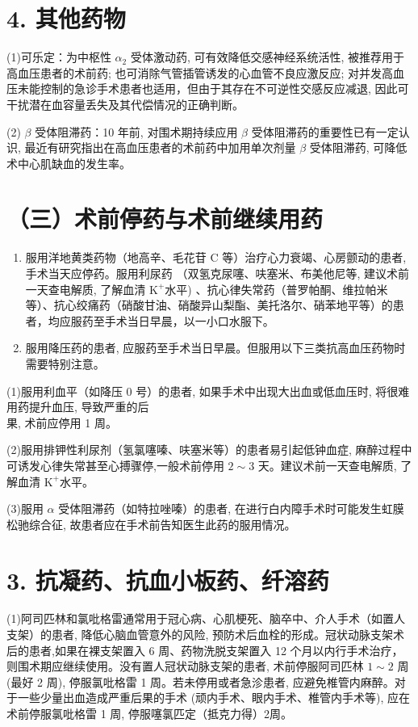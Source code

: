 \documentclass[10pt]{article}
\begin{document}
\section*{4. 其他药物}
(1)可乐定：为中枢性 $\alpha_{2}$ 受体激动药, 可有效降低交感神经系统活性, 被推荐用于高血压患者的术前药; 也可消除气管插管诱发的心血管不良应激反应; 对并发高血压未能控制的急诊手术患者也适用，但由于其存在不可逆性交感反应减退, 因此可干扰潜在血容量丢失及其代偿情况的正确判断。

(2) $\beta$ 受体阻滞药：10 年前, 对围术期持续应用 $\beta$ 受体阻滞药的重要性已有一定认识, 最近有研究指出在高血压患者的术前药中加用单次剂量 $\beta$ 受体阻滞药, 可降低术中心肌缺血的发生率。

\section*{（三）术前停药与术前继续用药}
\begin{enumerate}
  \item 服用洋地黄类药物（地高辛、毛花苷 C 等）治疗心力衰竭、心房颤动的患者, 手术当天应停药。服用利尿药 （双氢克尿噻、呋塞米、布美他尼等, 建议术前一天查电解质, 了解血清 $\mathrm{K}^{+}$水平) 、抗心律失常药（普罗帕酮、维拉帕米等）、抗心绞痛药（硝酸甘油、硝酸异山梨酯、美托洛尔、硝苯地平等）的患者，均应服药至手术当日早晨，以一小口水服下。

  \item 服用降压药的患者, 应服药至手术当日早晨。但服用以下三类抗高血压药物时需要特别注意。

\end{enumerate}

(1)服用利血平（如降压 0 号）的患者, 如果手术中出现大出血或低血压时, 将很难用药提升血压, 导致严重的后\\
果, 术前应停用 1 周。

(2)服用排钾性利尿剂（氢氯噻嗪、呋塞米等）的患者易引起低钟血症, 麻醉过程中可诱发心律失常甚至心搏骤停,一般术前停用 $2 \sim 3$ 天。建议术前一天查电解质, 了解血清 $\mathrm{K}^{+}$水平。

(3)服用 $\alpha$ 受体阻滞药（如特拉唑嗪）的患者, 在进行白内障手术时可能发生虹膜松驰综合征, 故患者应在手术前告知医生此药的服用情况。

\section*{3. 抗凝药、抗血小板药、纤溶药}
(1)阿司匹林和氯吡格雷通常用于冠心病、心肌梗死、脑卒中、介人手术（如置人支架）的患者, 降低心脑血管意外的风险, 预防术后血栓的形成。冠状动脉支架术后的患者,如果在裸支架置入 6 周、药物洗脱支架置入 12 个月以内行手术治疗，则围术期应继续使用。没有置人冠状动脉支架的患者, 术前停服阿司匹林 $1 \sim 2$ 周 (最好 2 周), 停服氯吡格雷 1 周。若未停用或者急沴患者, 应避免椎管内麻醉。对于一些少量出血造成严重后果的手术 (顽内手术、眼内手术、椎管内手术等), 应在术前停服氯吡格雷 1 周, 停服噻氯匹定（抵克力得）2周。
\end{document}
